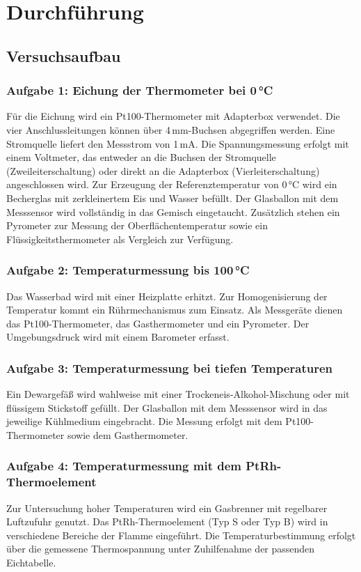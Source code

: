 \chapter{Durchführung}

\section{Versuchsaufbau}

\subsection*{Aufgabe 1: Eichung der Thermometer bei 0\,°C}
Für die Eichung wird ein Pt100-Thermometer mit Adapterbox verwendet. Die vier Anschlussleitungen können über 4\,mm-Buchsen abgegriffen werden. Eine Stromquelle liefert den Messstrom von 1\,mA. Die Spannungsmessung erfolgt mit einem Voltmeter, das entweder an die Buchsen der Stromquelle (Zweileiterschaltung) oder direkt an die Adapterbox (Vierleiterschaltung) angeschlossen wird.  
Zur Erzeugung der Referenztemperatur von 0\,°C wird ein Becherglas mit zerkleinertem Eis und Wasser befüllt. Der Glasballon mit dem Messsensor wird vollständig in das Gemisch eingetaucht. Zusätzlich stehen ein Pyrometer zur Messung der Oberflächentemperatur sowie ein Flüssigkeitsthermometer als Vergleich zur Verfügung.

\subsection*{Aufgabe 2: Temperaturmessung bis 100\,°C}
Das Wasserbad wird mit einer Heizplatte erhitzt. Zur Homogenisierung der Temperatur kommt ein Rührmechanismus zum Einsatz. Als Messgeräte dienen das Pt100-Thermometer, das Gasthermometer und ein Pyrometer. Der Umgebungsdruck wird mit einem Barometer erfasst.

\subsection*{Aufgabe 3: Temperaturmessung bei tiefen Temperaturen}
Ein Dewargefäß wird wahlweise mit einer Trockeneis-Alkohol-Mischung oder mit flüssigem Stickstoff gefüllt. Der Glasballon mit dem Messsensor wird in das jeweilige Kühlmedium eingebracht. Die Messung erfolgt mit dem Pt100-Thermometer sowie dem Gasthermometer.

\subsection*{Aufgabe 4: Temperaturmessung mit dem PtRh-Thermoelement}
Zur Untersuchung hoher Temperaturen wird ein Gasbrenner mit regelbarer Luftzufuhr genutzt. Das PtRh-Thermoelement (Typ S oder Typ B) wird in verschiedene Bereiche der Flamme eingeführt. Die Temperaturbestimmung erfolgt über die gemessene Thermospannung unter Zuhilfenahme der passenden Eichtabelle.

